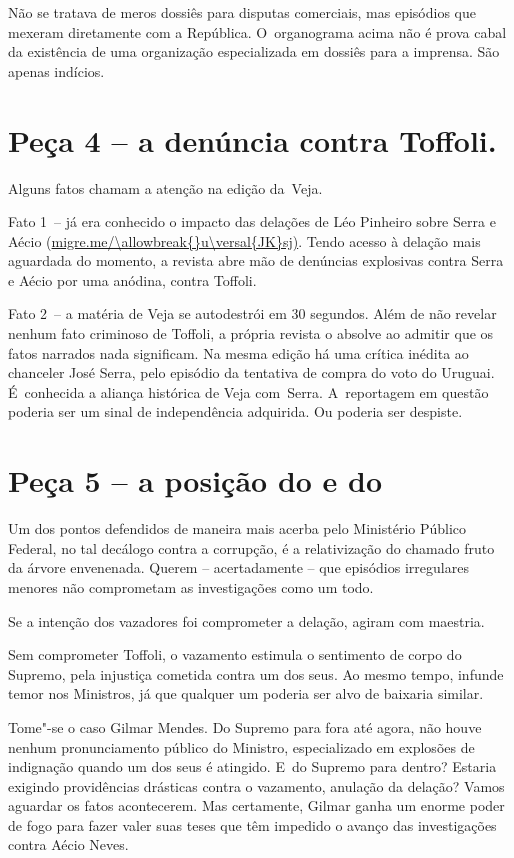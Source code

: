 Não se tratava de meros dossiês para disputas comerciais, mas episódios
que mexeram diretamente com a República. O~organograma acima não é prova
cabal da existência de uma organização especializada em dossiês para a
imprensa. São apenas indícios.

\section{Peça 4 -- a denúncia contra Toffoli.}

Alguns fatos chamam a atenção na edição da~Veja.

Fato 1~-- já era conhecido o impacto das delações de Léo Pinheiro sobre
Serra e Aécio (\url{migre.me/\allowbreak{}u\versal{JK}sj)}. Tendo acesso à delação mais
aguardada do momento, a revista abre mão de denúncias explosivas contra
Serra e Aécio por uma anódina, contra Toffoli.

Fato 2~-- a matéria de Veja se autodestrói em 30 segundos. Além de não
revelar nenhum fato criminoso de Toffoli, a própria revista o absolve ao
admitir que os fatos narrados nada significam. Na mesma edição há uma
crítica inédita ao chanceler José Serra, pelo episódio da tentativa de
compra do voto do Uruguai. É~conhecida a aliança histórica de Veja
com~Serra. A~reportagem em questão poderia ser um sinal de independência
adquirida. Ou poderia ser despiste.

\section{Peça 5 -- a posição do  e do }

Um dos pontos defendidos de maneira mais acerba pelo Ministério Público
Federal, no tal decálogo contra a corrupção, é a relativização do
chamado fruto da árvore envenenada. Querem -- acertadamente -- que
episódios irregulares menores não comprometam as investigações como um
todo.

Se a intenção dos vazadores foi comprometer a delação, agiram com
maestria.

Sem comprometer Toffoli, o vazamento estimula o sentimento de corpo do
Supremo, pela injustiça cometida contra um dos seus. Ao mesmo tempo,
infunde temor nos Ministros, já que qualquer um poderia ser alvo de
baixaria similar.

Tome"-se o caso Gilmar Mendes. Do Supremo para fora até agora, não houve
nenhum pronunciamento público do Ministro, especializado em explosões de
indignação quando um dos seus é atingido. E~do Supremo para dentro?
Estaria exigindo providências drásticas contra o vazamento, anulação da
delação? Vamos aguardar os fatos acontecerem. Mas certamente, Gilmar
ganha um enorme poder de fogo para fazer valer suas teses que têm
impedido o avanço das investigações contra Aécio Neves.

